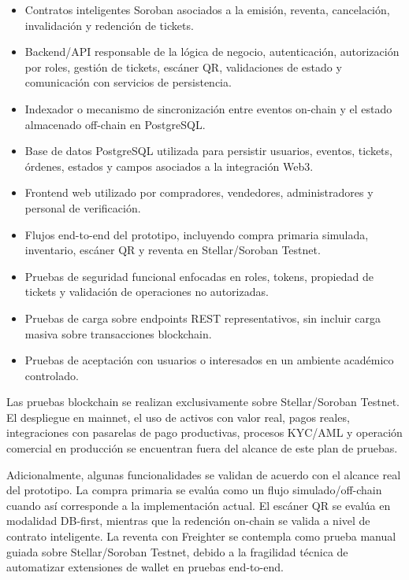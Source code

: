 \documentclass[12pt,letterpaper]{article}
\begin{document}
\begin{itemize}
    \item Contratos inteligentes Soroban asociados a la emisión, reventa, cancelación, invalidación y redención de tickets.
    \item Backend/API responsable de la lógica de negocio, autenticación, autorización por roles, gestión de tickets, escáner QR, validaciones de estado y comunicación con servicios de persistencia.
    \item Indexador o mecanismo de sincronización entre eventos on-chain y el estado almacenado off-chain en PostgreSQL.
    \item Base de datos PostgreSQL utilizada para persistir usuarios, eventos, tickets, órdenes, estados y campos asociados a la integración Web3.
    \item Frontend web utilizado por compradores, vendedores, administradores y personal de verificación.
    \item Flujos end-to-end del prototipo, incluyendo compra primaria simulada, inventario, escáner QR y reventa en Stellar/Soroban Testnet.
    \item Pruebas de seguridad funcional enfocadas en roles, tokens, propiedad de tickets y validación de operaciones no autorizadas.
    \item Pruebas de carga sobre endpoints REST representativos, sin incluir carga masiva sobre transacciones blockchain.
    \item Pruebas de aceptación con usuarios o interesados en un ambiente académico controlado.
\end{itemize}

Las pruebas blockchain se realizan exclusivamente sobre Stellar/Soroban Testnet. El despliegue en mainnet, el uso de activos con valor real, pagos reales, integraciones con pasarelas de pago productivas, procesos KYC/AML y operación comercial en producción se encuentran fuera del alcance de este plan de pruebas.

Adicionalmente, algunas funcionalidades se validan de acuerdo con el alcance real del prototipo. La compra primaria se evalúa como un flujo simulado/off-chain cuando así corresponde a la implementación actual. El escáner QR se evalúa en modalidad DB-first, mientras que la redención on-chain se valida a nivel de contrato inteligente. La reventa con Freighter se contempla como prueba manual guiada sobre Stellar/Soroban Testnet, debido a la fragilidad técnica de automatizar extensiones de wallet en pruebas end-to-end.
\end{document}
